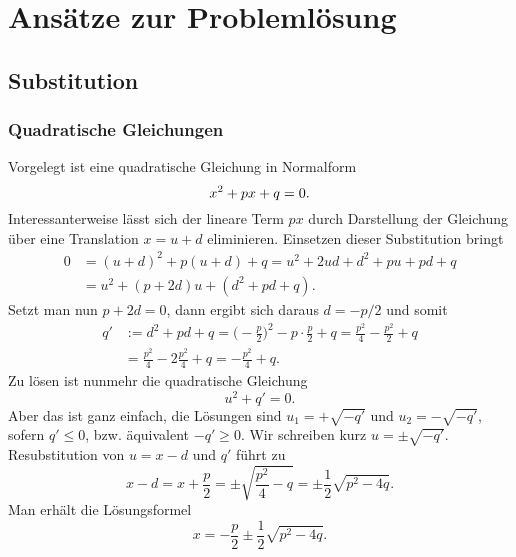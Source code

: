 
\chapter{Ansätze zur Problemlösung}

\section{Substitution}

\subsection{Quadratische Gleichungen}%

Vorgelegt ist eine quadratische Gleichung in Normalform
\begin{equation}\index{Normalform!einer quadratischen Gleichung}
x^2+px+q = 0.
\end{equation}
Interessanterweise lässt sich der lineare Term $px$ durch Darstellung
der Gleichung über eine Translation $x=u+d$ eliminieren. Einsetzen
dieser Substitution bringt
\begin{align}
0 &= (u+d)^2+p(u+d)+q = u^2+2ud+d^2+pu+pd+q\\
&= u^2+(p+2d)u+(d^2+pd+q).
\end{align}
Setzt man nun $p+2d=0$, dann ergibt sich daraus $d=-p/2$ und somit
\begin{align}
q' &:= d^2+pd+q = \Big(-\frac{p}{2}\Big)^2-p\cdot\frac{p}{2}+q
= \frac{p^2}{4}-\frac{p^2}{2}+q\\
&= \frac{p^2}{4}-2\frac{p^2}{4}+q = -\frac{p^2}{4}+q.
\end{align}
Zu lösen ist nunmehr die quadratische Gleichung
\begin{equation}
u^2+q' = 0.
\end{equation}
Aber das ist ganz einfach, die Lösungen sind $u_1=+\sqrt{-q'}$
und $u_2=-\sqrt{-q'}$, sofern $q'\le 0$,
bzw. äquivalent $-q'\ge 0$. Wir schreiben kurz $u=\pm\sqrt{-q'}$.
Resubstitution von $u=x-d$ und $q'$ führt zu
\begin{equation}
x-d = x+\frac{p}{2} = \pm\sqrt{\frac{p^2}{4}-q} = \pm\frac{1}{2}\sqrt{p^2-4q}.
\end{equation}
Man erhält die Lösungsformel
\begin{equation}
x = -\frac{p}{2}\pm\frac{1}{2}\sqrt{p^2-4q}.
\end{equation}

